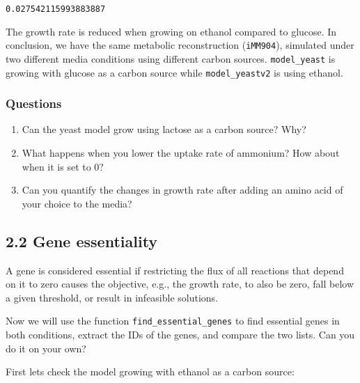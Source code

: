 \documentclass[11pt]{article}
\makeatletter
\providecommand{\tightlist}{%
      \setlength{\itemsep}{0pt}\setlength{\parskip}{0pt}}
\newcommand{\boxspacing}{\kern\kvtcb@left@rule\kern\kvtcb@boxsep}
\newcommand{\prompt}[4]{
        {\ttfamily\llap{{\color{#2}[#3]:\hspace{3pt}#4}}\vspace{-\baselineskip}}
    }
\makeatother
\begin{document}
            \begin{tcolorbox}[breakable, size=fbox, boxrule=.5pt, pad at break*=1mm, opacityfill=0]
\prompt{Out}{outcolor}{5}{\boxspacing}
\begin{Verbatim}[commandchars=\\\{\}]
0.027542115993883887
\end{Verbatim}
\end{tcolorbox}
        
    The growth rate is reduced when growing on ethanol compared to glucose.
In conclusion, we have the same metabolic reconstruction
(\texttt{iMM904}), simulated under two different media conditions using
different carbon sources. \texttt{model\_yeast} is growing with glucose
as a carbon source while \texttt{model\_yeastv2} is using ethanol.

\hypertarget{questions}{%
\subsubsection{Questions}\label{questions}}

\begin{enumerate}
\def\labelenumi{\arabic{enumi}.}
\tightlist
\item
  Can the yeast model grow using lactose as a carbon source? Why?
\item
  What happens when you lower the uptake rate of ammonium? How about
  when it is set to 0?
\item
  Can you quantify the changes in growth rate after adding an amino acid
  of your choice to the media?
\end{enumerate}

    \hypertarget{gene-essentiality}{%
\subsection{2.2 Gene essentiality}\label{gene-essentiality}}

    A gene is considered essential if restricting the flux of all reactions
that depend on it to zero causes the objective, e.g., the growth rate,
to also be zero, fall below a given threshold, or result in infeasible
solutions.

Now we will use the function \texttt{find\_essential\_genes} to find
essential genes in both conditions, extract the IDs of the genes, and
compare the two lists. Can you do it on your own?

First lets check the model growing with ethanol as a carbon source:
\end{document}
